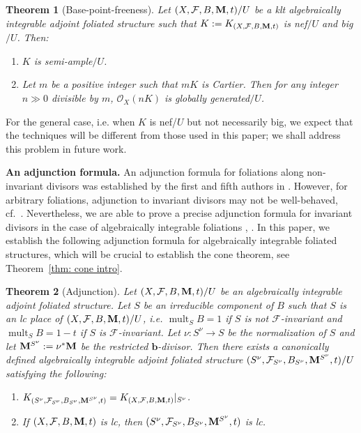 \documentclass[12pt]{amsart}
\numberwithin{equation}{section}
\newcommand{\bb}{\bm{b}}
\newcommand{\Mm}{{\bf{M}}}
\newcommand{\mult}{\operatorname{mult}}
\newcommand{\Ff}{\mathcal{F}}
\newtheorem{thm}{Theorem}[section]
\theoremstyle{definition}
\theoremstyle{definition}
\theoremstyle{definition}
\begin{document}
\begin{thm}[Base-point-freeness]\label{thm: bpf intro}
Let $(X,\Ff,B,\Mm,t)/U$ be a klt algebraically integrable adjoint foliated structure such that $K:=K_{(X,\Ff,B,\Mm,t)}$ is nef$/U$ and big$/U$. Then:
\begin{enumerate}
\item $K$ is semi-ample$/U$.
\item Let $m$ be a positive integer such that $mK$ is Cartier. Then for any integer $n\gg 0$ divisible by $m$, $\mathcal{O}_X(nK)$ is globally generated$/U$.
\end{enumerate}
\end{thm}

For the general case, i.e. when $K$ is nef/$U$ but not necessarily big, we expect that the techniques will be different from those used in this paper; 
we shall address this problem in future work. 


\medskip

\noindent\textbf{An adjunction formula.} An adjunction formula for foliations along non-invariant divisors was established by the first and fifth authors in \cite[Theorems 1.1 and 3.16]{CS23b}. 
However, for arbitrary foliations, adjunction to invariant divisors may not be well-behaved, cf.~\cite[Example 3.20]{CS20}. 
Nevertheless, we are able to prove a precise adjunction formula for invariant divisors in the case of algebraically integrable foliations \cite[Proposition 3.2]{ACSS21}, \cite[Theorem 2.4.2]{CHLX23}. 
In this paper, we establish the following adjunction formula for algebraically integrable foliated structures, which will be crucial to establish the cone theorem, see Theorem~\ref{thm: cone intro}.

\begin{thm}[Adjunction]\label{thm: adj intro}
Let $(X,\Ff,B,\Mm,t)/U$ be an algebraically integrable adjoint foliated structure.
Let $S$ be an irreducible component of $B$ such that $S$ is an lc place of $(X,\Ff,B,\Mm,t)/U$, 
i.e. $\mult_{S}B=1$ if $S$ is not $\Ff$-invariant and $\mult_{S}B=1-t$ if $S$ is $\Ff$-invariant. 
Let $\nu \colon S^{\nu} \to S$ be the normalization of $S$ and let $\Mm^{S^{\nu}}:=\nu^\ast \Mm$  be the restricted $\bb$-divisor. 
Then there exists a canonically defined algebraically integrable adjoint foliated structure $(S^{\nu},\Ff_{S^{\nu}},B_{S^{\nu}},\Mm^{S^{\nu}},t)/U$ satisfying the following:
\begin{enumerate}
    \item $K_{(S^{\nu},\Ff_{S^{\nu}},B_{S^{\nu}},\Mm^{S^{\nu}},t)}=
    K_{(X,\Ff,B,\Mm,t)}|_{S^\nu}$. 
    \item If $(X,\Ff,B,\Mm,t)$ is lc, then $(S^{\nu},\Ff_{S^{\nu}},B_{S^{\nu}},\Mm^{S^{\nu}},t)$ 
    is lc. 
\end{enumerate}
\end{thm}
\end{document}

